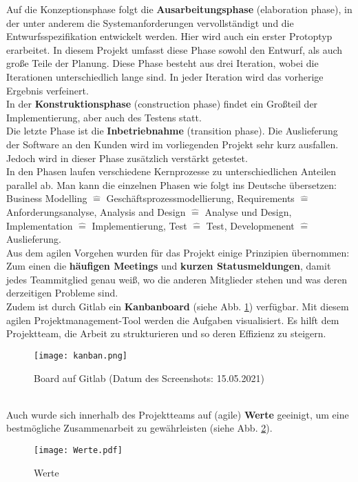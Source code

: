 \documentclass[../review_1.tex]{subfiles}
\begin{document}
Auf die Konzeptionsphase folgt die \textbf{Ausarbeitungsphase} (elaboration phase), in der unter anderem die Systemanforderungen vervollständigt und die Entwurfsspezifikation entwickelt werden. Hier wird auch ein erster Protoptyp erarbeitet. In diesem Projekt umfasst diese Phase sowohl den Entwurf, als auch große Teile der Planung. Diese Phase besteht aus drei Iteration, wobei die Iterationen unterschiedlich lange sind. In jeder Iteration wird das vorherige Ergebnis verfeinert.	\\
In der \textbf{Konstruktionsphase} (construction phase) findet ein Großteil der Implementierung, aber auch des Testens statt.\\
Die letzte Phase ist die \textbf{Inbetriebnahme} (transition phase). Die Auslieferung der Software an den Kunden wird im vorliegenden Projekt sehr kurz ausfallen. Jedoch wird in dieser Phase zusätzlich verstärkt getestet.\\
In den Phasen laufen verschiedene Kernprozesse zu unterschiedlichen Anteilen parallel ab. Man kann die einzelnen Phasen wie folgt ins Deutsche übersetzen: Business Modelling $\widehat{=}$ Geschäftsprozessmodellierung, Requirements $\widehat{=}$Anforderungsanalyse, Analysis and Design $\widehat{=}$ Analyse und Design, Implementation $\widehat{=}$ Implementierung, Test $\widehat{=}$ Test, Developmenent $\widehat{=}$ Auslieferung. \\
Aus dem agilen Vorgehen wurden für das Projekt einige Prinzipien übernommen: Zum einen die \textbf{häufigen Meetings} und \textbf{kurzen Statusmeldungen}, damit jedes Teammitglied genau weiß, wo die anderen Mitglieder stehen und was deren derzeitigen Probleme sind.\\
Zudem ist durch Gitlab ein \textbf{Kanbanboard} (siehe Abb. \ref{board}) verfügbar. Mit diesem agilen Projektmanagement-Tool werden die Aufgaben visualisiert. Es hilft dem Projektteam, die Arbeit zu strukturieren und so deren Effizienz zu steigern.\\
\vspace{-0.5cm}
\begin{figure} [h]
    \centering
    \texttt{[image: kanban.png]}
    \caption{Board auf Gitlab (Datum des Screenshots: 15.05.2021)}
    \label{board}
\end{figure} \\
\noindent Auch wurde sich innerhalb des Projektteams auf (agile) \textbf{Werte} geeinigt, um eine bestmögliche Zusammenarbeit zu gewährleisten (siehe Abb. \ref{werte}).
\begin{figure} [H]
    \centering
    \texttt{[image: Werte.pdf]}
    \caption{Werte}
    \label{werte}
\end{figure}
\end{document}
